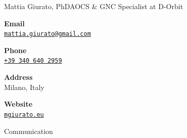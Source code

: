 \documentclass{article}
\begin{document}
\begin{cv}[avatar]{Mattia Giurato, PhD}{AOCS \& GNC Specialist at D-Orbit}



\cvsidebar %


\begin{cvitem}[Envelope][4]
    \textbf{Email}\\
    \href{mailto:mattia.giurato@gmail.com}{\texttt{mattia.giurato@gmail.com}}
\end{cvitem}

\cvseparator[3]
\begin{cvitem}[Phone][4]
    \textbf{Phone}\\
    \href{tel:+393406402959}{\texttt{+39 340 640 2959}}
\end{cvitem}

\cvseparator[3]
\begin{cvitem}[Home][4]
    \textbf{Address}\\
    Milano, Italy
\end{cvitem}

\cvseparator[3]
\begin{cvitem}[Globe][4]
    \textbf{Website}\\
    \href{https://mgiurato.eu/}{\texttt{mgiurato.eu}}
\end{cvitem}


\cvseparator
\begin{cvitem}
    Communication
\end{cvitem}


\end{cv}
\end{document}
